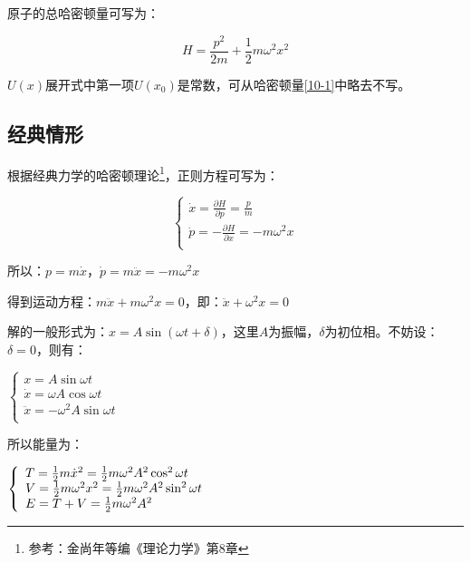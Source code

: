 原子的总哈密顿量可写为：

\begin{equation}\label{10-1}
H = \frac{{p^2 }}{{2m}} + \frac{1}{2}m\omega ^2 x^2
\end{equation}

$U(x)$展开式中第一项$U(x_0)$是常数，可从哈密顿量\ref{10-1}中略去不写。



\subsection{经典情形}
根据经典力学的哈密顿理论\footnote{参考：金尚年等编《理论力学》第8章}，正则方程可写为：

\begin{equation}\label{10-2}
\left\{ \begin{array}{l}
 \dot x = \frac{{\partial H}}{{\partial p}} = \frac{p}{m} \\
 \dot p =  - \frac{{\partial H}}{{\partial x}} =  - m\omega ^2 x \\
 \end{array} \right.
\end{equation}

所以：$p = m\dot x$，$\dot p = m\ddot x =  - m\omega ^2 x$

得到运动方程：$m\ddot x + m\omega ^2 x = 0$，即：$\ddot x + \omega ^2 x = 0$

解的一般形式为：$x = A\sin \left( {\omega t + \delta } \right)$，这里$A$为振幅，$\delta$为初位相。不妨设：$\delta=0$，则有：

\begin{center}
$\left\{ \begin{array}{l}
 x = A\sin \omega t \\
 \dot x = \omega A\cos \omega t \\
 \ddot x =  - \omega ^2 A\sin \omega t \\
 \end{array} \right.$
\end{center}

所以能量为：

\begin{center}
$
\left\{ \begin{array}{l}
 T = {\textstyle{1 \over 2}}m\dot x^2  = {\textstyle{1 \over 2}}m\omega ^2 A^2 \cos ^2 \omega t \\
 V = {\textstyle{1 \over 2}}m\omega ^2 x^2  = {\textstyle{1 \over 2}}m\omega ^2 A^2 \sin ^2 \omega t \\
 E = T + V = {\textstyle{1 \over 2}}m\omega ^2 A^2  \\
 \end{array} \right.
$
\end{center}

